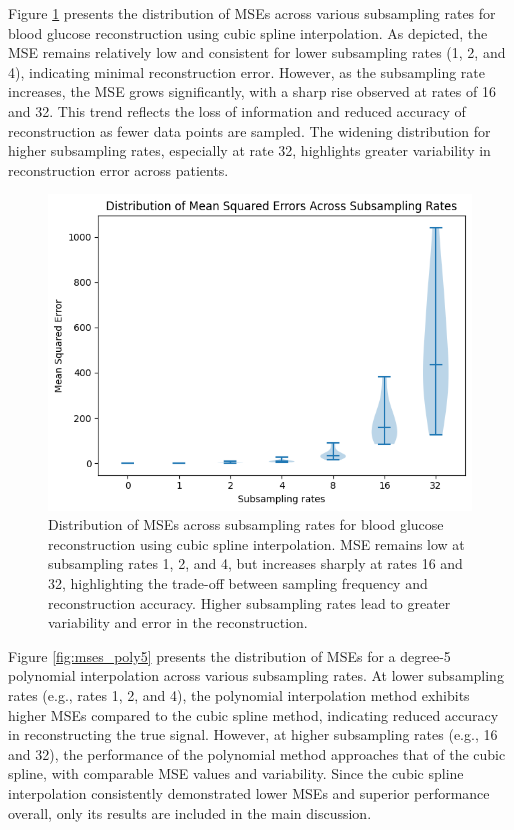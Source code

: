 Figure \ref{fig:mses} presents the distribution of MSEs across various subsampling rates for blood glucose reconstruction using cubic spline interpolation. As depicted, the MSE remains relatively low and consistent for lower subsampling rates (1, 2, and 4), indicating minimal reconstruction error. However, as the subsampling rate increases, the MSE grows significantly, with a sharp rise observed at rates of 16 and 32. This trend reflects the loss of information and reduced accuracy of reconstruction as fewer data points are sampled. The widening distribution for higher subsampling rates, especially at rate 32, highlights greater variability in reconstruction error across patients.

\begin{figure}[h] %
	\centering
	\includegraphics[width=\linewidth]{Figures/distribution_mses.png} %
	\caption{Distribution of MSEs across subsampling rates for blood glucose reconstruction using cubic spline interpolation. MSE remains low at subsampling rates 1, 2, and 4, but increases sharply at rates 16 and 32, highlighting the trade-off between sampling frequency and reconstruction accuracy. Higher subsampling rates lead to greater variability and error in the reconstruction.}
	\label{fig:mses}  %
\end{figure}
Figure \ref{fig:mses_poly5} presents the distribution of MSEs for a degree-5 polynomial interpolation across various subsampling rates. At lower subsampling rates (e.g., rates 1, 2, and 4), the polynomial interpolation method exhibits higher MSEs compared to the cubic spline method, indicating reduced accuracy in reconstructing the true signal. However, at higher subsampling rates (e.g., 16 and 32), the performance of the polynomial method approaches that of the cubic spline, with comparable MSE values and variability. Since the cubic spline interpolation consistently demonstrated lower MSEs and superior performance overall, only its results are included in the main discussion.
